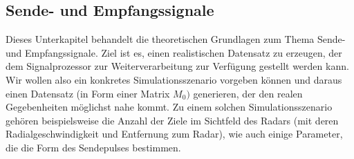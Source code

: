 
\subsection{Sende- und Empfangssignale}
\label{subsec:Signale}

Dieses Unterkapitel behandelt die theoretischen Grundlagen zum Thema Sende- und Empfangssignale. Ziel ist es, einen realistischen Datensatz zu erzeugen, der dem Signalprozessor zur Weiterverarbeitung zur Verfügung gestellt werden kann. Wir wollen also ein konkretes Simulationsszenario vorgeben können und daraus einen Datensatz (in Form einer Matrix \(M_0)\) generieren, der den realen Gegebenheiten möglichst nahe kommt. Zu einem solchen Simulationsszenario gehören beispielsweise die Anzahl der Ziele im Sichtfeld des Radars (mit deren Radialgeschwindigkeit und Entfernung zum Radar), wie auch einige Parameter, die die Form des Sendepulses bestimmen.

